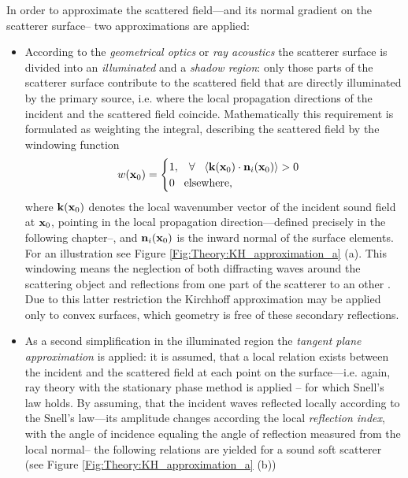 In order to approximate the scattered field---and its normal gradient on the scatterer surface-- two approximations are applied:
\begin{itemize}
\item According to the \emph{geometrical optics} or \emph{ray acoustics} the scatterer surface is divided into an \emph{illuminated} and a \emph{shadow region}: only those parts of the scatterer surface contribute to the scattered field that are directly illuminated by the primary source, i.e. where the local propagation directions of the incident and the scattered field coincide.
Mathematically this requirement is formulated as weighting the integral, describing the scattered field by the windowing function
\begin{equation}
w(\mathbf{x}_0) = \begin{cases}
                        1, \hspace{3mm} \forall \hspace{3mm} \langle \mathbf{k}(\mathbf{x}_0) \cdot \mathbf{n}_i(\mathbf{x}_0) \rangle > 0 \\
                        0  \hspace{3mm} \text{elsewhere},
                    \end{cases}
\label{eq:theory:windowing_function}
\end{equation}
where $\mathbf{k}(\mathbf{x}_0)$ denotes the local wavenumber vector of the incident sound field at $\mathbf{x}_0$, pointing in the local propagation direction---defined precisely in the following chapter--, and $ \mathbf{n}_i(\mathbf{x}_0)$ is the inward normal of the surface elements. For an illustration see Figure \ref{Fig:Theory:KH_approximation_a} (a).
%
This windowing means the neglection of both diffracting waves around the scattering object and reflections from one part of the scatterer to an other \cite{Pignier2015}. Due to this latter restriction the Kirchhoff approximation may be applied only to convex surfaces, which geometry is free of these secondary reflections.
%
\item As a second simplification in the illuminated region the \emph{tangent plane approximation} is applied: it is assumed, that a local relation exists between the incident and the scattered field at each point on the surface---i.e. again, ray theory with the stationary phase method is applied \cite{Bleistein1984, Bleistein2000, Voronich2007}-- for which Snell's law holds.
By assuming, that the incident waves reflected locally according to the Snell's law---its amplitude changes according the local \emph{reflection index}, with the angle of incidence equaling the angle of reflection measured from the local normal-- the following relations are yielded for a sound soft scatterer \cite{Bleistein1984, Bleistein2000, Pike2002} (see Figure \ref{Fig:Theory:KH_approximation_a} (b))

\end{itemize}
